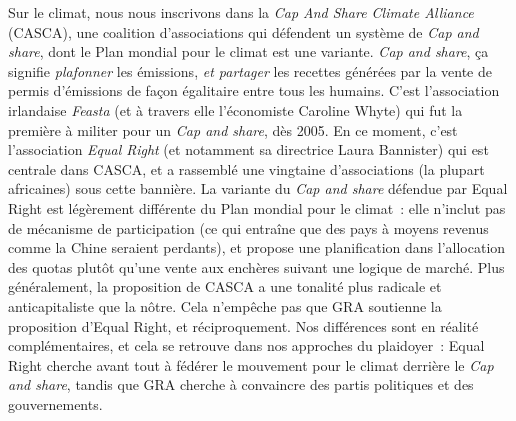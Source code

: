 \documentclass[a5paper,french,openany]{memoir}
\begin{document}
Sur le climat, nous nous inscrivons dans la \textit{Cap And Share Climate Alliance} (CASCA), une coalition d'associations qui défendent un système de \textit{Cap and share}, dont le Plan mondial pour le climat est une variante. \textit{Cap and share}, ça signifie \textit{plafonner} les émissions, \textit{et partager} les recettes générées par la vente de permis d'émissions de façon égalitaire entre tous les humains. C'est l'association irlandaise \textit{Feasta} (et à travers elle l'économiste Caroline Whyte) qui fut la première à militer pour un \textit{Cap and share}, dès 2005. En ce moment, c'est l'association \textit{Equal Right} (et notamment sa directrice Laura Bannister) qui est centrale dans CASCA, et a rassemblé une vingtaine d'associations (la plupart africaines) sous cette bannière. La variante du \textit{Cap and share} défendue par Equal Right est légèrement différente du Plan mondial pour le climat~: elle n'inclut pas de mécanisme de participation (ce qui entraîne que des pays à moyens revenus comme la Chine seraient perdants), et propose une planification dans l'allocation des quotas plutôt qu'une vente aux enchères suivant une logique de marché. Plus généralement, la proposition de CASCA a une tonalité plus radicale et anticapitaliste que la nôtre. Cela n'empêche pas que GRA soutienne la proposition d'Equal Right, et réciproquement. Nos différences sont en réalité complémentaires, et cela se retrouve dans nos approches du plaidoyer~: Equal Right cherche avant tout à fédérer le mouvement pour le climat derrière le \textit{Cap and share}, tandis que GRA cherche à convaincre des partis politiques et des gouvernements. 

\end{document}
